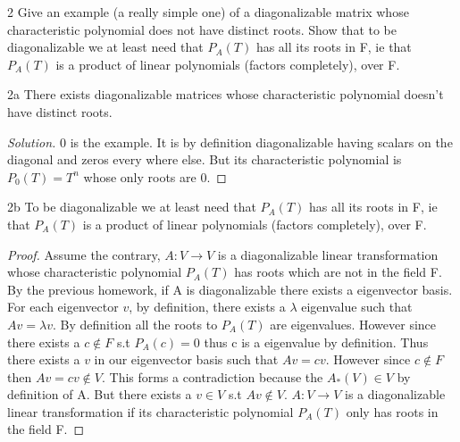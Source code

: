 \documentclass{article}
\newcommand{\rarr}[0]{\rightarrow}
\newenvironment{solution}
{\renewcommand\qedsymbol{$\blacksquare$}\begin{proof}[Solution]}
		{\end{proof}}
\begin{document}
\begin{PROB}{2}\label{Problem 2.}
    Give an example (a really simple one) of a diagonalizable matrix whose characteristic polynomial does not have distinct roots.  Show that to be diagonalizable we at least need that $P_A(T)$ has all its roots in F, ie that $P_A(T)$ is a product of linear polynomials (factors completely), over F.  
\end{PROB}
\begin{claim}{2a}
    There exists diagonalizable matrices whose characteristic polynomial doesn't have distinct roots.
\end{claim}
\begin{solution}
    0 is the example. It is by definition diagonalizable having scalars on the diagonal and zeros every where else. But its characteristic polynomial is $P_0(T) = T^n$ whose only roots are 0.
\end{solution}
\begin{claim}{2b}
    To be diagonalizable we at least need that $P_A(T)$ has all its roots in F, ie that $P_A(T)$ is a product of linear polynomials (factors completely), over F.
\end{claim}
\begin{proof}
    Assume the contrary, $A: V \rarr V$ is a diagonalizable linear transformation whose characteristic polynomial $P_A(T)$ has roots which are not in the field F. By the previous homework, if A is diagonalizable there exists a eigenvector basis. For each eigenvector $v$, by definition, there exists a $\lambda$ eigenvalue such that $Av = \lambda v$. By definition all the roots to $P_A(T)$ are eigenvalues. However since there exists a $c \not \in F$ s.t $P_A(c) = 0$ thus c is a eigenvalue by definition. Thus there exists a $v$ in our eigenvector basis such that $Av = cv$. However since $c \not \in F$ then $Av = cv \not \in V$. This forms a contradiction because the $A_*(V) \in V$ by definition of A. But there exists a $v \in V$ s.t $Av \not \in V$. $A: V \rarr V$ is a diagonalizable linear transformation if its characteristic polynomial $P_A(T)$ only has roots in the field F.
\end{proof}

\bigskip
\end{document}
